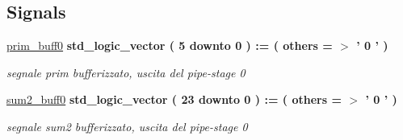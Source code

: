 \subsection*{Signals}
 \begin{DoxyCompactItemize}
\item 
\hyperlink{group___linear_regression_ga2f2ba1395426f682c5257c7549946eba}{prim\+\_\+buff0} {\bfseries \textcolor{vhdlchar}{std\+\_\+logic\+\_\+vector}\textcolor{vhdlchar}{ }\textcolor{vhdlchar}{(}\textcolor{vhdlchar}{ }\textcolor{vhdlchar}{ } \textcolor{vhdldigit}{5} \textcolor{vhdlchar}{ }\textcolor{vhdlchar}{downto}\textcolor{vhdlchar}{ }\textcolor{vhdlchar}{ } \textcolor{vhdldigit}{0} \textcolor{vhdlchar}{ }\textcolor{vhdlchar}{)}\textcolor{vhdlchar}{ }\textcolor{vhdlchar}{ }\textcolor{vhdlchar}{ }\textcolor{vhdlchar}{\+:}\textcolor{vhdlchar}{=}\textcolor{vhdlchar}{ }\textcolor{vhdlchar}{(}\textcolor{vhdlchar}{ }\textcolor{vhdlchar}{ }\textcolor{vhdlchar}{others}\textcolor{vhdlchar}{ }\textcolor{vhdlchar}{ }\textcolor{vhdlchar}{=}\textcolor{vhdlchar}{ }\textcolor{vhdlchar}{$>$}\textcolor{vhdlchar}{ }\textcolor{vhdlchar}{'}\textcolor{vhdlchar}{ } \textcolor{vhdldigit}{0} \textcolor{vhdlchar}{ }\textcolor{vhdlchar}{'}\textcolor{vhdlchar}{ }\textcolor{vhdlchar}{)}\textcolor{vhdlchar}{ }} 
\begin{DoxyCompactList}\small\item\em segnale prim bufferizzato, uscita del pipe-\/stage 0 \end{DoxyCompactList}\item 
\hyperlink{group___linear_regression_ga78bc8ef63466051b7ffb10623742f533}{sum2\+\_\+buff0} {\bfseries \textcolor{vhdlchar}{std\+\_\+logic\+\_\+vector}\textcolor{vhdlchar}{ }\textcolor{vhdlchar}{(}\textcolor{vhdlchar}{ }\textcolor{vhdlchar}{ } \textcolor{vhdldigit}{23} \textcolor{vhdlchar}{ }\textcolor{vhdlchar}{downto}\textcolor{vhdlchar}{ }\textcolor{vhdlchar}{ } \textcolor{vhdldigit}{0} \textcolor{vhdlchar}{ }\textcolor{vhdlchar}{)}\textcolor{vhdlchar}{ }\textcolor{vhdlchar}{ }\textcolor{vhdlchar}{ }\textcolor{vhdlchar}{\+:}\textcolor{vhdlchar}{=}\textcolor{vhdlchar}{ }\textcolor{vhdlchar}{(}\textcolor{vhdlchar}{ }\textcolor{vhdlchar}{ }\textcolor{vhdlchar}{others}\textcolor{vhdlchar}{ }\textcolor{vhdlchar}{ }\textcolor{vhdlchar}{=}\textcolor{vhdlchar}{ }\textcolor{vhdlchar}{$>$}\textcolor{vhdlchar}{ }\textcolor{vhdlchar}{'}\textcolor{vhdlchar}{ } \textcolor{vhdldigit}{0} \textcolor{vhdlchar}{ }\textcolor{vhdlchar}{'}\textcolor{vhdlchar}{ }\textcolor{vhdlchar}{)}\textcolor{vhdlchar}{ }} 
\begin{DoxyCompactList}\small\item\em segnale sum2 bufferizzato, uscita del pipe-\/stage 0 \end{DoxyCompactList}\item 

\end{DoxyCompactItemize}
